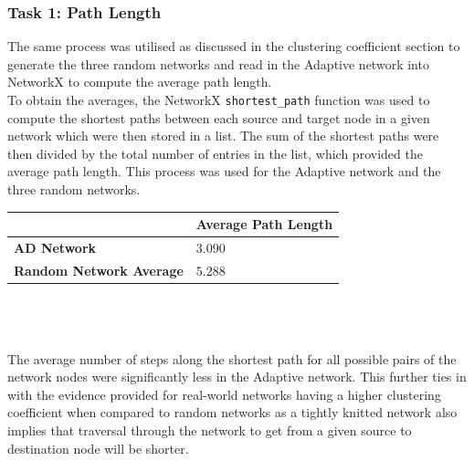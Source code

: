 \documentclass[conference]{IEEEtran}
\begin{document}
		\subsubsection{Task 1: Path Length}
			{
				The same process was utilised as discussed in the clustering coefficient section to generate the three random networks and read in the Adaptive network into NetworkX to compute the average path length. \\
				
				To obtain the averages, the NetworkX \texttt{shortest\_path} function was used to compute the shortest paths between each source and target node in a given network which were then stored in a list. The sum of the shortest paths were then divided by the total number of entries in the list, which provided the average path length. This process was used for the Adaptive network and the three random networks. \\

				\begin{tabularx}{0.95\linewidth}{| X | X |}
					\hline
					\, & \textbf{Average Path Length} \\ \hline
					\textbf{AD Network} & $3.090$ \\ \hline
					\textbf{Random Network Average} & $5.288$ \\ \hline
				\end{tabularx}
				\\ \\ \\
				The average number of steps along the shortest path for all possible pairs of the network nodes were significantly less in the Adaptive network. This further ties in with the evidence provided for real-world networks having a higher clustering coefficient when compared to random networks as a tightly knitted network also implies that traversal through the network to get from a given source to destination node will be shorter.
			\par}
			
\end{document}
